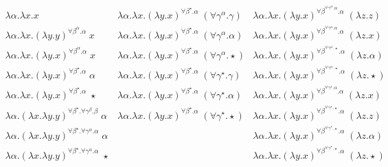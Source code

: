 \documentclass[acmsmall]{acmart}
\begin{document}
\setlength{\arraycolsep}{3pt}
\[\!\!%
\begin{array}{llll}
\lambda \alpha . \lambda x . x &
\lambda \alpha . \lambda x . (\lambda y . x)^{\forall \beta^{\star } . \alpha} \; (\forall \gamma^{\alpha} . \gamma) &
\lambda \alpha . \lambda x . (\lambda y . x)^{\forall \beta^{\forall \gamma^{\alpha} . \alpha} . \alpha} \; (\lambda z . z) &
\\
\lambda \alpha . \lambda x . (\lambda y . y)^{\forall \beta^{\alpha} . \alpha} \; x &
\lambda \alpha . \lambda x . (\lambda y . x)^{\forall \beta^{\star } . \alpha} \; (\forall \gamma^{\alpha} . \alpha) &
\lambda \alpha . \lambda x . (\lambda y . x)^{\forall \beta^{\forall \gamma^{\alpha} . \alpha} . \alpha} \; (\lambda z . x) &
\\
\lambda \alpha . \lambda x . (\lambda y . x)^{\forall \beta^{\alpha} . \alpha} \; x &
\lambda \alpha . \lambda x . (\lambda y . x)^{\forall \beta^{\star } . \alpha} \; (\forall \gamma^{\alpha} . \star) &
\lambda \alpha . \lambda x . (\lambda y . x)^{\forall \beta^{\forall \gamma^{\alpha} . \star } . \alpha} \; (\lambda z . \alpha) &
\\
\lambda \alpha . \lambda x . (\lambda y . x)^{\forall \beta^{\star } . \alpha} \; \alpha &
\lambda \alpha . \lambda x . (\lambda y . x)^{\forall \beta^{\star } . \alpha} \; (\forall \gamma^{\star } . \gamma) &
\lambda \alpha . \lambda x . (\lambda y . x)^{\forall \beta^{\forall \gamma^{\alpha} . \star } . \alpha} \; (\lambda z . \star ) &
\\
\lambda \alpha . \lambda x . (\lambda y . x)^{\forall \beta^{\star } . \alpha} \; \star &
\lambda \alpha . \lambda x . (\lambda y . x)^{\forall \beta^{\star } . \alpha} \; (\forall \gamma^{\star } . \alpha) &
\lambda \alpha . \lambda x . (\lambda y . x)^{\forall \beta^{\forall \gamma^{\star } . \alpha} . \alpha} \; (\lambda z . x) &
\\
\lambda \alpha . (\lambda x . \lambda y . y)^{\forall \beta^{\star } . \forall \gamma^{\beta} . \beta} \; \alpha &
\lambda \alpha . \lambda x . (\lambda y . x)^{\forall \beta^{\star } . \alpha} \; (\forall \gamma^{\star } . \star) &
\lambda \alpha . \lambda x . (\lambda y . x)^{\forall \beta^{\forall \gamma^{\star } . \star } . \alpha} \; (\lambda z . z) &
\\
\lambda \alpha . (\lambda x . \lambda y . y)^{\forall \beta^{\star } . \forall \gamma^{\alpha} . \alpha} \; \alpha &
&
\lambda \alpha . \lambda x . (\lambda y . x)^{\forall \beta^{\forall \gamma^{\star } . \star } . \alpha} \; (\lambda z . \alpha) &
\\
\lambda \alpha . (\lambda x . \lambda y . y)^{\forall \beta^{\star } . \forall \gamma^{\alpha} . \alpha} \; \star &
&
\lambda \alpha . \lambda x . (\lambda y . x)^{\forall \beta^{\forall \gamma^{\star } . \star } . \alpha} \; (\lambda z . \star ) &
\end{array}
\]
\end{document}
